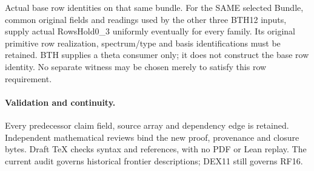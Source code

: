 \begin{description}[style=nextline]
\item[33. SLR\_BASE\_ROWS\_PRODUCER --- C] Actual base row identities on that same bundle. For the SAME selected Bundle, common original fields and readings used by the other three BTH12 inputs, supply actual RowsHold0\_3 uniformly eventually for every family. Its original primitive row realization, spectrum/\allowbreak{}type and basis identifications must be retained. BTH supplies a theta consumer only; it does not construct the base row identity. No separate witness may be chosen merely to satisfy this row requirement.

\end{description}

\paragraph{Validation and continuity.}
Every predecessor claim field, source array and dependency edge
is retained. Independent mathematical reviews bind the new proof,
provenance and closure bytes. Draft TeX checks syntax and
references, with no PDF or Lean replay. The current audit governs
historical frontier descriptions; DEX11 still governs RF16.
